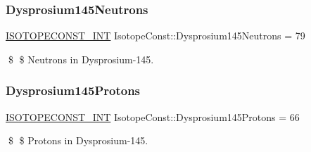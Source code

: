 \subsubsection{\texorpdfstring{Dysprosium145\+Neutrons}{Dysprosium145Neutrons}}
{\footnotesize\ttfamily \mbox{\hyperlink{group___isotope_const-_macros_ga5f18360b3e99483a35c32d789e62621c}{I\+S\+O\+T\+O\+P\+E\+C\+O\+N\+S\+T\+\_\+\+I\+NT}} Isotope\+Const\+::\+Dysprosium145\+Neutrons = 79}

\$ \$ Neutrons in Dysprosium-\/145. \mbox{\label{group___isotope_const-_dysprosium-_dy145_ga84d9af1997836961a33e5bc4805e3dd1}} 
\subsubsection{\texorpdfstring{Dysprosium145\+Protons}{Dysprosium145Protons}}
{\footnotesize\ttfamily \mbox{\hyperlink{group___isotope_const-_macros_ga5f18360b3e99483a35c32d789e62621c}{I\+S\+O\+T\+O\+P\+E\+C\+O\+N\+S\+T\+\_\+\+I\+NT}} Isotope\+Const\+::\+Dysprosium145\+Protons = 66}

\$ \$ Protons in Dysprosium-\/145. 
